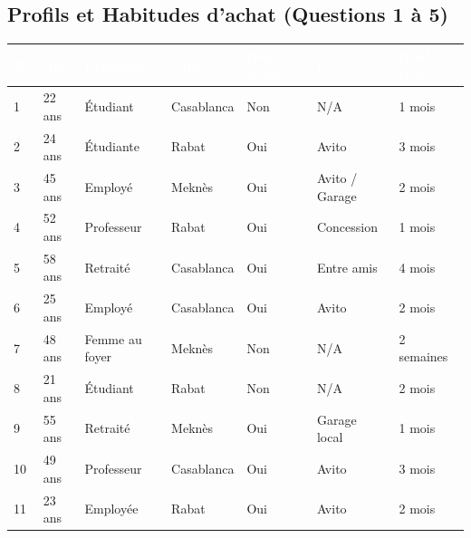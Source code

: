 \documentclass[a4paper, 11pt]{article}
\begin{document}
\subsection*{Profils et Habitudes d'achat (Questions 1 à 5)}
\begin{footnotesize}
\begin{longtable}{L{0.5cm} L{1.8cm} L{2.5cm} L{2cm} L{2.2cm} L{2.2cm} L{2.5cm}}
\toprule
{}
\textcolor{white}{\textbf{N°}} & \textcolor{white}{\textbf{Âge}} & \textcolor{white}{\textbf{Profession}} & \textcolor{white}{\textbf{Ville}} & \textcolor{white}{\textbf{Déjà acheté ?}} & \textcolor{white}{\textbf{Où ?}} & \textcolor{white}{\textbf{Durée rech.}} \\
\midrule
{} & 22 ans & Étudiant & Casablanca & Non & N/A & 1 mois \\
2 & 24 ans & Étudiante & Rabat & Oui & Avito & 3 mois \\
3 & 45 ans & Employé & Meknès & Oui & Avito / Garage & 2 mois \\
4 & 52 ans & Professeur & Rabat & Oui & Concession & 1 mois \\
5 & 58 ans & Retraité & Casablanca & Oui & Entre amis & 4 mois \\
6 & 25 ans & Employé & Casablanca & Oui & Avito & 2 mois \\
7 & 48 ans & Femme au foyer & Meknès & Non & N/A & 2 semaines \\
8 & 21 ans & Étudiant & Rabat & Non & N/A & 2 mois \\
9 & 55 ans & Retraité & Meknès & Oui & Garage local & 1 mois \\
10 & 49 ans & Professeur & Casablanca & Oui & Avito & 3 mois \\
11 & 23 ans & Employée & Rabat & Oui & Avito & 2 mois \\
\bottomrule
\end{longtable}
\end{footnotesize}
\end{document}
